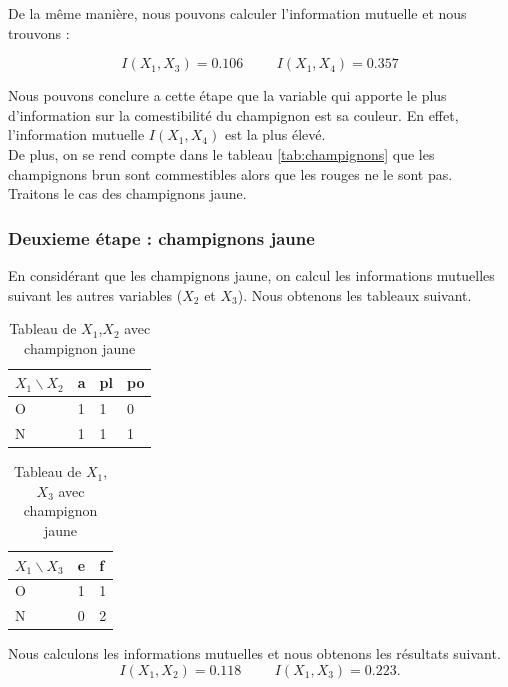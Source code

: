 \documentclass{article}
\begin{document}
De la même manière, nous pouvons calculer l'information mutuelle et nous trouvons :




\[
  I(X_1,X_3)=0.106 \hspace{1cm} I(X_1,X_4)=0.357
\]




Nous pouvons conclure a cette étape que la variable qui apporte le plus d'information sur la comestibilité du champignon est sa couleur. En effet, l'information mutuelle $I(X_1,X_4)$ est la plus élevé.
\\
De plus, on se rend compte dans le tableau \ref{tab:champignons} que les champignons brun sont commestibles alors que les rouges ne le sont pas.
\\
Traitons le cas des champignons jaune.
    
\subsubsection{Deuxieme étape : champignons jaune}
En considérant que les champignons jaune, on calcul les informations mutuelles suivant les autres variables ($X_2$ et $X_3$). Nous obtenons les tableaux suivant.

\begin{table}[H]
  \caption{Tableau de $X_1$,$X_2$ avec champignon jaune}
  \centering
  \begin{tabular}{|l|l|l|l|}
  \hline
  $X_1\backslash X_2$ & a & pl & po \\ \hline
  O                    & 1 & 1  & 0  \\ \hline
  N                    & 1 & 1  & 1  \\ \hline
  \end{tabular}
  \end{table}

\begin{table}[H]
  \centering
  \caption{Tableau de $X_1$,$X_3$ avec champignon jaune}
  \begin{tabular}{|l|l|l|}
  \hline
  $X_1\backslash X_3$ & e & f \\ \hline
  O                    & 1 & 1 \\ \hline
  N                    & 0 & 2 \\ \hline
  \end{tabular}
  \end{table}
Nous calculons les informations mutuelles et nous obtenons les résultats suivant.
\[
  I(X_1,X_2)=0.118 \hspace{1cm} I(X_1,X_3)=0.223.
\]
\end{document}
